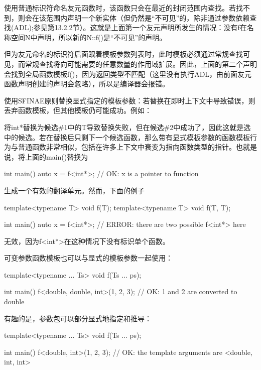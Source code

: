 使用普通标识符命名友元函数时，该函数只会在最近的封闭范围内查找。若找不到，则会在该范围内声明一个新实体（但仍然是“不可见”的，除非通过参数依赖查找(ADL);参见第13.2.2节）。这就是上面第一个友元声明所发生的情况：没有f在名称空间N中声明，所以新的N::f()是“不可见”的声明。

但为友元命名的标识符后面跟着模板参数列表时，此时模板必须通过常规查找可见，而常规查找将向可能需要的任意数量的作用域扩展。因此，上面的第二个声明会找到全局函数模板f()，因为返回类型不匹配（这里没有执行ADL，由前面友元函数声明创建的声明会忽略），所以是编译器会报错。

使用SFINAE原则替换显式指定的模板参数：若替换在即时上下文中导致错误，则丢弃函数模板，但其他模板仍可能成功。例如：


将int*替换为候选\#1中的T导致替换失败，但在候选\#2中成功了，因此这就是选中的候选。若在替换后只剩下一个候选函数，那么带有显式模板参数的函数模板行为与普通函数非常相似，包括在许多上下文中衰变为指向函数类型的指针。也就是说，将上面的main()替换为

\begin{cpp}
int main() {
	auto x = f<int*>; // OK: x is a pointer to function
}
\end{cpp}

生成一个有效的翻译单元。然而，下面的例子

\begin{cpp}
template<typename T> void f(T);
template<typename T> void f(T, T);

int main() {
	auto x = f<int*>; // ERROR: there are two possible f<int*> here
}
\end{cpp}

无效，因为f<int*>在这种情况下没有标识单个函数。

可变参数函数模板也可以与显式的模板参数一起使用：

\begin{cpp}
template<typename ... Ts> void f(Ts ... ps);

int main() {
	f<double, double, int>(1, 2, 3); // OK: 1 and 2 are converted to double
}
\end{cpp}

有趣的是，参数包可以部分显式地指定和推导：

\begin{cpp}
template<typename ... Ts> void f(Ts ... ps);

int main() {
	f<double, int>(1, 2, 3); // OK: the template arguments are <double, int, int>
}
\end{cpp}









